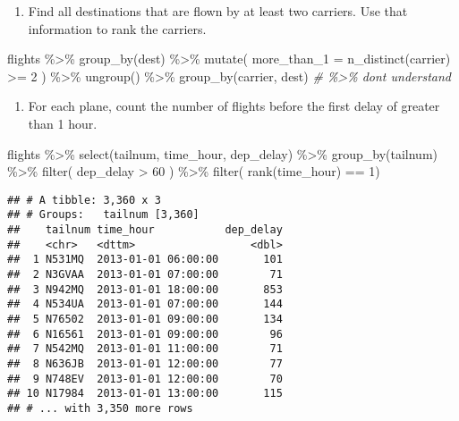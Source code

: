 \documentclass[
]{article}
\newenvironment{Shaded}{\begin{snugshade}}{\end{snugshade}}
\newcommand{\AttributeTok}[1]{\textcolor[rgb]{0.77,0.63,0.00}{#1}}
\newcommand{\CommentTok}[1]{\textcolor[rgb]{0.56,0.35,0.01}{\textit{#1}}}
\newcommand{\DecValTok}[1]{\textcolor[rgb]{0.00,0.00,0.81}{#1}}
\newcommand{\FunctionTok}[1]{\textcolor[rgb]{0.00,0.00,0.00}{#1}}
\newcommand{\NormalTok}[1]{#1}
\newcommand{\SpecialCharTok}[1]{\textcolor[rgb]{0.00,0.00,0.00}{#1}}
\providecommand{\tightlist}{%
  \setlength{\itemsep}{0pt}\setlength{\parskip}{0pt}}
\begin{document}
\begin{enumerate}
\def\labelenumi{\arabic{enumi}.}
\tightlist
\item
  Find all destinations that are flown by at least two carriers. Use
  that information to rank the carriers.
\end{enumerate}

\begin{Shaded}
\begin{Highlighting}[]
\NormalTok{flights }\SpecialCharTok{\%\textgreater{}\%} 
  \FunctionTok{group\_by}\NormalTok{(dest) }\SpecialCharTok{\%\textgreater{}\%} 
  \FunctionTok{mutate}\NormalTok{( }\AttributeTok{more\_than\_1 =} \FunctionTok{n\_distinct}\NormalTok{(carrier) }\SpecialCharTok{\textgreater{}=} \DecValTok{2}\NormalTok{ ) }\SpecialCharTok{\%\textgreater{}\%} 
  \FunctionTok{ungroup}\NormalTok{() }\SpecialCharTok{\%\textgreater{}\%} 
  \FunctionTok{group\_by}\NormalTok{(carrier, dest) }\CommentTok{\# \%\textgreater{}\%  don\textquotesingle{}t understand}
\end{Highlighting}
\end{Shaded}

\begin{enumerate}
\def\labelenumi{\arabic{enumi}.}
\tightlist
\item
  For each plane, count the number of flights before the first delay of
  greater than 1 hour.
\end{enumerate}

\begin{Shaded}
\begin{Highlighting}[]
\NormalTok{flights }\SpecialCharTok{\%\textgreater{}\%} 
  \FunctionTok{select}\NormalTok{(tailnum, time\_hour, dep\_delay) }\SpecialCharTok{\%\textgreater{}\%} 
  \FunctionTok{group\_by}\NormalTok{(tailnum) }\SpecialCharTok{\%\textgreater{}\%} 
  \FunctionTok{filter}\NormalTok{( dep\_delay }\SpecialCharTok{\textgreater{}} \DecValTok{60}\NormalTok{ ) }\SpecialCharTok{\%\textgreater{}\%} 
  \FunctionTok{filter}\NormalTok{( }\FunctionTok{rank}\NormalTok{(time\_hour) }\SpecialCharTok{==} \DecValTok{1}\NormalTok{)}
\end{Highlighting}
\end{Shaded}

\begin{verbatim}
## # A tibble: 3,360 x 3
## # Groups:   tailnum [3,360]
##    tailnum time_hour           dep_delay
##    <chr>   <dttm>                  <dbl>
##  1 N531MQ  2013-01-01 06:00:00       101
##  2 N3GVAA  2013-01-01 07:00:00        71
##  3 N942MQ  2013-01-01 18:00:00       853
##  4 N534UA  2013-01-01 07:00:00       144
##  5 N76502  2013-01-01 09:00:00       134
##  6 N16561  2013-01-01 09:00:00        96
##  7 N542MQ  2013-01-01 11:00:00        71
##  8 N636JB  2013-01-01 12:00:00        77
##  9 N748EV  2013-01-01 12:00:00        70
## 10 N17984  2013-01-01 13:00:00       115
## # ... with 3,350 more rows
\end{verbatim}
\end{document}

